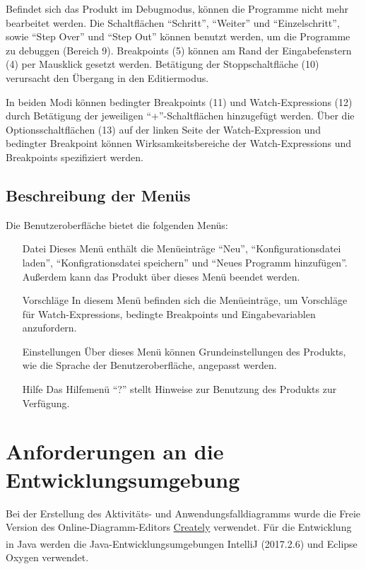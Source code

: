\documentclass[parskip=full]{scrartcl}
\begin{document}
        Befindet sich das Produkt im Debugmodus, können die Programme nicht mehr
        bearbeitet werden.
        Die Schaltflächen \enquote{Schritt}, \enquote{Weiter} und \enquote{Einzelschritt}, sowie \enquote{Step Over} und \enquote{Step Out} können
        benutzt werden, um die Programme zu debuggen (Bereich 9). \glspl{Breakpoint} (5) können am Rand der Eingabefenstern (4) per Mausklick gesetzt werden.
        Betätigung der Stoppschaltfläche (10) verursacht den Übergang in den Editiermodus.

        In beiden Modi können \glspl{bedingter Breakpoint} (11) und \glspl{Watch-Expression} (12) durch Betätigung der jeweiligen 
        \enquote{+}-Schaltflächen hinzugefügt werden. Über die Optionsschaltflächen (13) auf der linken Seite der Watch-Expression und bedingter Breakpoint können Wirksamkeitsbereiche der Watch-Expressions und Breakpoints
        spezifiziert werden.\\
     \subsection{Beschreibung der Menüs}
     Die Benutzeroberfläche bietet die folgenden Menüs:
     \begin{itemize}
     \item[Datei] Dieses Menü enthält die Menüeinträge \enquote{Neu}, \enquote{Konfigurationsdatei laden}, \enquote{Konfigrationsdatei speichern} und \enquote{Neues Programm hinzufügen}. Außerdem kann das Produkt über dieses Menü beendet werden.
     \item[Vorschläge] In diesem Menü befinden sich die Menüeinträge, um Vorschläge für Watch-Expressions, bedingte Breakpoints und Eingabevariablen anzufordern.
     \item[Einstellungen] Über dieses Menü können Grundeinstellungen des Produkts, wie die Sprache der Benutzeroberfläche, angepasst werden.
     \item[Hilfe] Das Hilfemenü \enquote{?} stellt Hinweise zur Benutzung des Produkts zur Verfügung.
     \end{itemize}
       
\section{Anforderungen an die Entwicklungsumgebung}
Bei der Erstellung des Aktivitäts- und Anwendungsfalldiagramms wurde die Freie Version des Online-Diagramm-Editors \href{https://creately.com/}{Creately} verwendet.
Für die Entwicklung in Java werden die Java-Entwicklungsumgebungen IntelliJ\textsuperscript{\textcopyright} (2017.2.6) und Eclipse\textsuperscript{\textcopyright} Oxygen verwendet.
\end{document}
